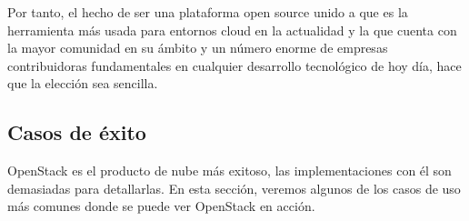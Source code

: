 Por tanto, el hecho de ser una plataforma open source unido a que es la herramienta más usada para entornos cloud en la actualidad y la que cuenta con la mayor comunidad en su ámbito y un número enorme de empresas contribuidoras fundamentales en cualquier desarrollo tecnológico de hoy día, hace que la elección sea sencilla.

\subsection{Casos de éxito}

OpenStack es el producto de nube más exitoso, las implementaciones con él son demasiadas para detallarlas. En esta sección, veremos algunos de los casos de uso más comunes donde se puede ver OpenStack en acción.\cite{shrivastwa_openstack_2015}

